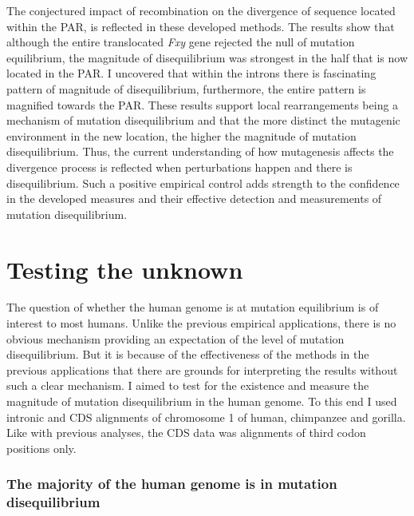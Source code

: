 

The conjectured impact of recombination on the divergence of sequence located within the PAR, is reflected in these developed methods. The results show that although the entire translocated \textit{Fxy} gene rejected the null of mutation equilibrium, the magnitude of disequilibrium was strongest in the half that is now located in the PAR. I uncovered that within the introns there is fascinating pattern of magnitude of disequilibrium, furthermore, the entire pattern is magnified towards the PAR. These results support local rearrangements being a mechanism of mutation disequilibrium and that the more distinct the mutagenic environment in the new location, the higher the magnitude of mutation disequilibrium. Thus, the current understanding of how mutagenesis affects the divergence process is reflected when perturbations happen and there is disequilibrium. Such a positive empirical control adds strength to the confidence in the developed measures and their effective detection and measurements of mutation disequilibrium. 

\section{Testing the unknown}

The question of whether the human genome is at mutation equilibrium is of interest to most humans. Unlike the previous empirical applications, there is no obvious mechanism providing an expectation of the level of mutation disequilibrium. But it is because of the effectiveness of the methods in the previous applications that there are grounds for interpreting the results without such a clear mechanism. I aimed to test for the existence and measure the magnitude of mutation disequilibrium in the human genome. To this end I used intronic and CDS alignments of chromosome 1 of human, chimpanzee and gorilla. Like with previous analyses, the CDS data was alignments of third codon positions only. 

\subsubsection{The majority of the human genome is in mutation disequilibrium}

